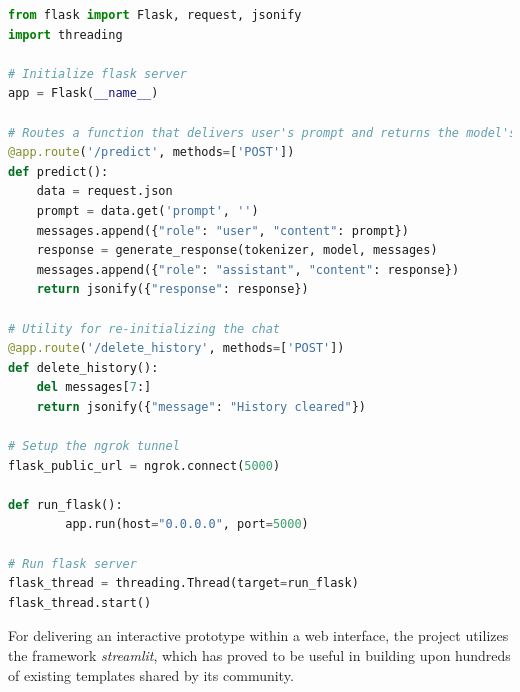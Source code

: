 \begin{center}
\begin{lstlisting}[language=Python, frame=single, caption=Writing the Streamlit web app.]
from flask import Flask, request, jsonify
import threading
    
# Initialize flask server
app = Flask(__name__)

# Routes a function that delivers user's prompt and returns the model's response in a JSON format
@app.route('/predict', methods=['POST'])
def predict():
    data = request.json
    prompt = data.get('prompt', '')
    messages.append({"role": "user", "content": prompt})
    response = generate_response(tokenizer, model, messages)
    messages.append({"role": "assistant", "content": response})
    return jsonify({"response": response})

# Utility for re-initializing the chat
@app.route('/delete_history', methods=['POST'])
def delete_history():
    del messages[7:]
    return jsonify({"message": "History cleared"})
     
# Setup the ngrok tunnel
flask_public_url = ngrok.connect(5000)
    
def run_flask():
        app.run(host="0.0.0.0", port=5000)
    
# Run flask server
flask_thread = threading.Thread(target=run_flask)
flask_thread.start()
\end{lstlisting}
\end{center}

For delivering an interactive prototype within a web interface, the project utilizes the framework \textit{streamlit}, which has proved to be useful in building upon hundreds of existing templates shared by its community.

